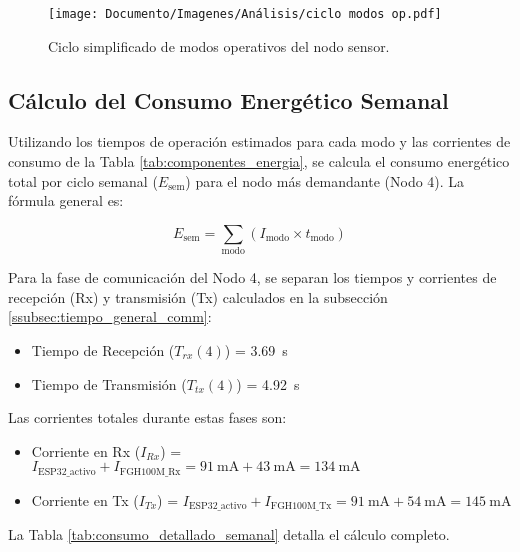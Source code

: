 \begin{figure}[H]
    \centering
    \texttt{[image: Documento/Imagenes/Análisis/ciclo modos op.pdf]} %
    \caption{Ciclo simplificado de modos operativos del nodo sensor.}
    \label{fig:ciclo_mod_op}
\end{figure}




\subsection{Cálculo del Consumo Energético Semanal}
\label{subsec:calculo_consumo}

Utilizando los tiempos de operación estimados para cada modo y las corrientes de consumo de la Tabla \ref{tab:componentes_energia}, se calcula el consumo energético total por ciclo semanal ($E_{\text{sem}}$) para el nodo más demandante (Nodo 4). La fórmula general es:

\begin{equation} \label{eq:energia_semanal}
E_{\text{sem}} = \sum_{\text{modo}} (I_{\text{modo}} \times t_{\text{modo}})
\end{equation}

Para la fase de comunicación del Nodo 4, se separan los tiempos y corrientes de recepción (Rx) y transmisión (Tx) calculados en la subsección \ref{ssubsec:tiempo_general_comm}:
\begin{itemize}
    \item Tiempo de Recepción ($T_{rx}(4)$) = \SI{3.69}{\second}
    \item Tiempo de Transmisión ($T_{tx}(4)$) = \SI{4.92}{\second}
\end{itemize}
Las corrientes totales durante estas fases son:
\begin{itemize}
    \item Corriente en Rx ($I_{Rx}$) = $I_{\text{ESP32\_activo}} + I_{\text{FGH100M\_Rx}} = \SI{91}{\milli\ampere} + \SI{43}{\milli\ampere} = \SI{134}{\milli\ampere}$
    \item Corriente en Tx ($I_{Tx}$) = $I_{\text{ESP32\_activo}} + I_{\text{FGH100M\_Tx}} = \SI{91}{\milli\ampere} + \SI{54}{\milli\ampere} = \SI{145}{\milli\ampere}$
\end{itemize}

La Tabla \ref{tab:consumo_detallado_semanal} detalla el cálculo completo.

